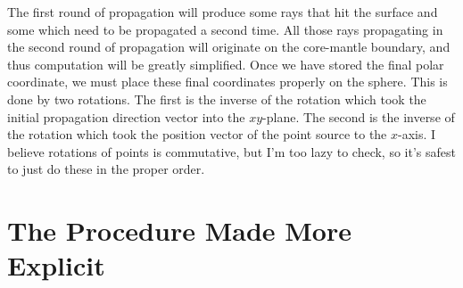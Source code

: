 \documentclass{article}
\begin{document}
The first round of propagation will produce some rays that hit the surface and some which need to be propagated a second time. All those rays propagating in the second round of propagation will originate on the core-mantle boundary, and thus computation will be greatly simplified. Once we have stored the final polar coordinate, we must place these final coordinates properly on the sphere. This is done by two rotations. The first is the inverse of the rotation which took the initial propagation direction vector into the $xy$-plane. The second is the inverse of the rotation which took the position vector of the point source to the $x$-axis. I believe rotations of points is commutative, but I'm too lazy to check, so it's safest to just do these in the proper order.
\pagebreak
\section{The Procedure Made More Explicit}
\end{document}
